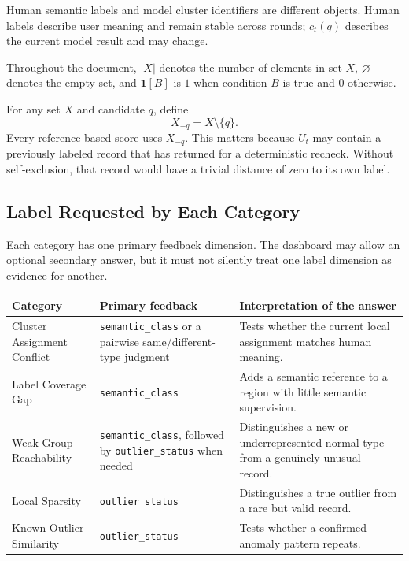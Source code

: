 \documentclass[11pt]{article}
\begin{document}
Human semantic labels and model cluster identifiers are different objects.
Human labels describe user meaning and remain stable across rounds; $c_t(q)$
describes the current model result and may change.

Throughout the document, $|X|$ denotes the number of elements in set $X$,
$\varnothing$ denotes the empty set, and $\mathbf{1}[B]$ is $1$ when condition
$B$ is true and $0$ otherwise.

For any set $X$ and candidate $q$, define
\begin{equation}
    X_{-q}=X\setminus\{q\}.
\end{equation}
Every reference-based score uses $X_{-q}$. This matters because $U_t$ may
contain a previously labeled record that has returned for a deterministic
recheck. Without self-exclusion, that record would have a trivial distance of
zero to its own label.

\subsection{Label Requested by Each Category}

Each category has one primary feedback dimension. The dashboard may allow an
optional secondary answer, but it must not silently treat one label dimension
as evidence for another.

\begin{table}[h]
\centering
\small
\begin{tabularx}{\textwidth}{p{} p{} X}
\toprule
Category & Primary feedback & Interpretation of the answer \\
\midrule
Cluster Assignment Conflict & \texttt{semantic\_class} or a pairwise
same/different-type judgment & Tests whether the current local assignment
matches human meaning. \\

Label Coverage Gap & \texttt{semantic\_class} & Adds a semantic reference to a
region with little semantic supervision. \\

Weak Group Reachability & \texttt{semantic\_class}, followed by
\texttt{outlier\_status} when needed & Distinguishes a new or underrepresented
normal type from a genuinely unusual record. \\

Local Sparsity & \texttt{outlier\_status} & Distinguishes a true outlier from a
rare but valid record. \\

Known-Outlier Similarity & \texttt{outlier\_status} & Tests whether a confirmed
anomaly pattern repeats. \\
\bottomrule
\end{tabularx}
\end{table}
\end{document}
